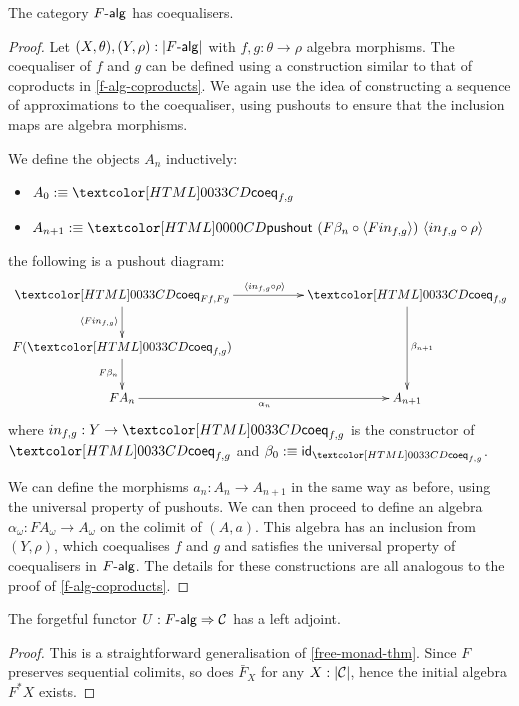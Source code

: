 \begin{proposition}
  The category $\algcat{F}$ has coequalisers.
\end{proposition}

\begin{proof}
  Let $(X,\theta),(Y,\rho) : | \algcat{F} |$ with
  $f, g : \theta \to \rho$ algebra morphisms. The coequaliser of $f$
  and $g$ can be defined using a construction similar to that of
  coproducts in \cref{f-alg-coproducts}. We again use the idea of
  constructing a sequence of approximations to the coequaliser, using
  pushouts to ensure that the inclusion maps are algebra morphisms. 

  We define the objects $A_n$ inductively:
  \begin{itemize}
  \item $A_0 \ddefeq \coeqty{f}{g}$
  \item $A_{n+1} \ddefeq \pushout{(F\beta_n \circ \langle F in_{f,g} \rangle)}{\langle in_{f,g} \circ \rho \rangle}$
  \end{itemize}
  \ie the following is a pushout diagram:
  $$
  \xymatrix{
    \coeqty{Ff}{Fg}
    \ar[rr]^{\langle in_{f,g} \circ \rho \rangle}
    \ar[d]_{\langle F in_{f,g} \rangle}
    &&\coeqty{f}{g}
    \ar[dd]^{\beta_{n+1}}
    \\
    F (\coeqty{f}{g})
    \ar[d]_{F\beta_n}
    \\
    FA_n 
    \ar[rr]_{\alpha_n}
    &&A_{n+1}
  }
  $$
  where $in_{f,g} : Y \to \coeqty{f}{g}$ is the constructor of
  $\coeqty{f}{g}$ and $\beta_0 \ddefeq \id_{\coeqty{f}{g}}$.

  We can define the morphisms $a_n : A_n \to A_{n+1}$ in the same way
  as before, using the universal property of pushouts. We can then
  proceed to define an algebra
  $\alpha_{\omega} : FA_{\omega} \to A_{\omega}$ on the colimit of
  $(A,a)$. This algebra has an inclusion from $(Y,\rho)$, which
  coequalises $f$ and $g$ and satisfies the universal property of
  coequalisers in $\algcat{F}$. The details for these constructions
  are all analogous to the proof of \cref{f-alg-coproducts}.
  
\end{proof}

\begin{proposition}
  The forgetful functor $U : \Func{\algcat{F}}{\Cc}$ has a left
  adjoint.
\end{proposition}

\begin{proof}
  This is a straightforward generalisation of
  \cref{free-monad-thm}. Since $F$ preserves sequential colimits, so
  does $\bar{F}_X$ for any $X : | \mathcal{C} |$, hence the initial algebra
  $F^* X$ exists.
\end{proof}

